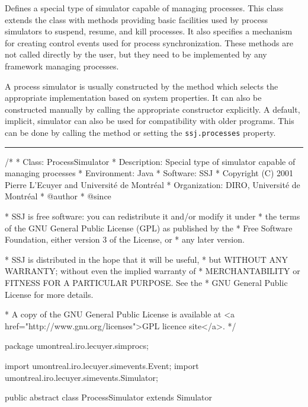
Defines a special type of simulator capable of managing processes.
This class extends the  class
with methods providing basic facilities used by process simulators
to suspend, resume, and kill processes.
It also specifies a mechanism for creating control events used for process synchronization.
These methods are not called directly by the user, but they
need to be implemented by any framework managing processes.

A process simulator is usually constructed by the  method which
selects the appropriate implementation based on system properties.
It can also be constructed manually  by calling the appropriate constructor explicitly.
A default, implicit, simulator can also be used for compatibility with older programs.
This can be done by calling the  method or setting the
\texttt{ssj.processes} property.

\bigskip\hrule

\begin{code}

\begin{hide}
/*
 * Class:        ProcessSimulator
 * Description:  Special type of simulator capable of managing processes
 * Environment:  Java
 * Software:     SSJ 
 * Copyright (C) 2001  Pierre L'Ecuyer and Université de Montréal
 * Organization: DIRO, Université de Montréal
 * @author       
 * @since

 * SSJ is free software: you can redistribute it and/or modify it under
 * the terms of the GNU General Public License (GPL) as published by the
 * Free Software Foundation, either version 3 of the License, or
 * any later version.

 * SSJ is distributed in the hope that it will be useful,
 * but WITHOUT ANY WARRANTY; without even the implied warranty of
 * MERCHANTABILITY or FITNESS FOR A PARTICULAR PURPOSE.  See the
 * GNU General Public License for more details.

 * A copy of the GNU General Public License is available at
   <a href="http://www.gnu.org/licenses">GPL licence site</a>.
 */
\end{hide}
package umontreal.iro.lecuyer.simprocs;\begin{hide}

import umontreal.iro.lecuyer.simevents.Event;
import umontreal.iro.lecuyer.simevents.Simulator;
\end{hide}

public abstract class ProcessSimulator extends Simulator \begin{hide} {

   protected SimProcess currentProcess;
   // The process who has control right now (current process).
   // If no process has control (an event is executing), current = null.
\end{hide}
\end{code}

